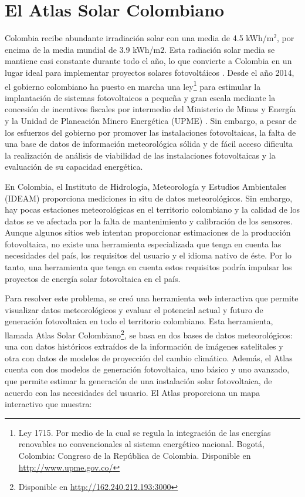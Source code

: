 \section{El Atlas Solar Colombiano}
Colombia recibe abundante irradiación solar con una media de 4.5 kWh/m$^2$, por encima de la media mundial de 3.9 kWh/m$2$. Esta radiación solar media se 
mantiene casi constante durante todo el año, lo que convierte a Colombia en un lugar ideal para implementar proyectos solares fotovoltáicos 
\cite{abril_study_2021}. Desde el año 2014, el gobierno colombiano ha puesto en marcha una ley\footnote{Ley 1715. Por medio de la cual se regula la 
integración de las energías renovables no convencionales al sistema energético nacional. Bogotá, Colombia: Congreso de la República de Colombia. Disponible en 
\url{http://www.upme.gov.co/}} para estimular la implantación de sistemas fotovoltaicos a pequeña y gran escala mediante la concesión de incentivos fiscales por 
intermedio del Ministerio de Minas y Energía y la Unidad de Planeación Minero Energética (UPME) . Sin embargo, a pesar de los esfuerzos del gobierno por 
promover las instalaciones fotovoltaicas, la falta de una base de datos de 
información meteorológica sólida y de fácil acceso dificulta la realización de análisis de viabilidad de las instalaciones fotovoltaicas y la evaluación de su 
capacidad energética. 

En Colombia, el Instituto de Hidrología, Meteorología y Estudios Ambientales (IDEAM) proporciona mediciones in situ de datos meteorológicos. Sin embargo, hay 
pocas estaciones meteorológicas en el territorio colombiano y la calidad de los datos se ve afectada por la falta de mantenimiento y calibración de los 
sensores. Aunque algunos sitios web intentan proporcionar estimaciones de la producción fotovoltaica, no existe una herramienta especializada que tenga en 
cuenta las necesidades del país, los requisitos del usuario y el idioma nativo de éste. Por lo tanto, una herramienta que tenga en cuenta estos requisitos 
podría impulsar los proyectos de energía solar fotovoltaica en el país.

Para resolver este problema, se creó una herramienta web interactiva que permite visualizar datos meteorológicos y evaluar el potencial actual y futuro de 
generación fotovoltaica en todo el territorio colombiano. Esta herramienta, llamada Atlas Solar 
Colombiano\footnote{Disponible en \url{http://162.240.212.193:3000}}, se basa en dos 
bases de datos meteorológicos: una con datos históricos extraídos de la información de imágenes satelitales y otra con datos de modelos de proyección del 
cambio climático. Además, el Atlas cuenta con dos modelos de generación fotovoltaica, uno básico y uno avanzado, que permite estimar la generación de una 
instalación solar fotovoltaica, de acuerdo con las necesidades del usuario. El Atlas proporciona un mapa interactivo que muestra:


